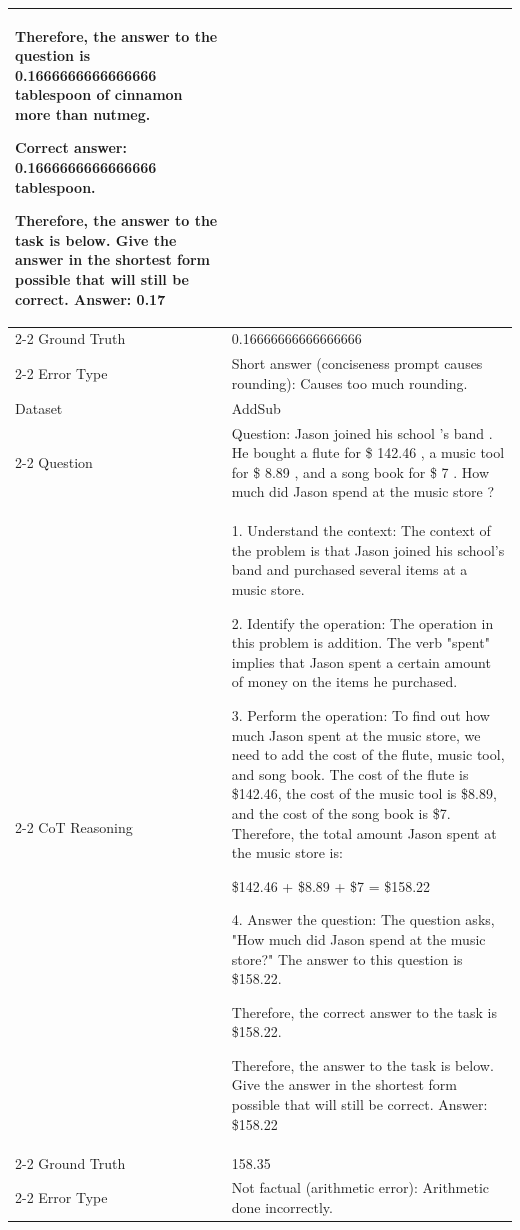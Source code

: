 \begin{longtable} {p{3cm}p{13.85cm}}
Therefore, the answer to the question is 0.1666666666666666 tablespoon of cinnamon more than nutmeg.

Correct answer: 0.1666666666666666 tablespoon.

Therefore, the answer to the task is below. Give the answer in the shortest form possible that will still be correct.
Answer: 0.17 \\ \cline{2-2}
Ground Truth & 0.16666666666666666 \\ \cline{2-2}
Error Type & Short answer (conciseness prompt causes rounding): Causes too much rounding.\\ 

\midrule

Dataset & AddSub \\ \cline{2-2}
Question & Question: Jason joined his school 's band . He bought a flute for \$ 142.46 , a music tool for \$ 8.89 , and a song book for \$ 7 . How much did Jason spend at the music store ? \\ \cline{2-2}
CoT Reasoning & 1. Understand the context: The context of the problem is that Jason joined his school's band and purchased several items at a music store.

2. Identify the operation: The operation in this problem is addition. The verb "spent" implies that Jason spent a certain amount of money on the items he purchased.

3. Perform the operation: To find out how much Jason spent at the music store, we need to add the cost of the flute, music tool, and song book. The cost of the flute is \$142.46, the cost of the music tool is \$8.89, and the cost of the song book is \$7. Therefore, the total amount Jason spent at the music store is:

\$142.46 + \$8.89 + \$7 = \$158.22

4. Answer the question: The question asks, "How much did Jason spend at the music store?" The answer to this question is \$158.22.

Therefore, the correct answer to the task is \$158.22.

Therefore, the answer to the task is below. Give the answer in the shortest form possible that will still be correct.
Answer: \$158.22 \\ \cline{2-2}
Ground Truth & 158.35 \\ \cline{2-2}
Error Type & Not factual (arithmetic error): Arithmetic done incorrectly.\\ 

\midrule


\end{longtable}
